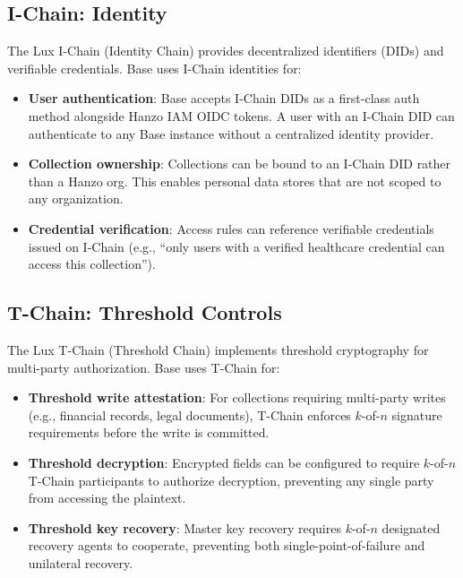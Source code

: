 \documentclass[11pt]{article}
\begin{document}
\subsection{I-Chain: Identity}

The Lux I-Chain (Identity Chain) provides decentralized identifiers (DIDs)
and verifiable credentials. Base uses I-Chain identities for:

\begin{itemize}[leftmargin=1.1em]
    \item \textbf{User authentication}: Base accepts I-Chain DIDs as a first-class
    auth method alongside Hanzo IAM OIDC tokens. A user with an I-Chain DID
    can authenticate to any Base instance without a centralized identity
    provider.
    \item \textbf{Collection ownership}: Collections can be bound to an I-Chain
    DID rather than a Hanzo org. This enables personal data stores that are
    not scoped to any organization.
    \item \textbf{Credential verification}: Access rules can reference verifiable
    credentials issued on I-Chain (e.g., ``only users with a verified
    healthcare credential can access this collection'').
\end{itemize}

\subsection{T-Chain: Threshold Controls}

The Lux T-Chain (Threshold Chain) implements threshold cryptography for
multi-party authorization. Base uses T-Chain for:

\begin{itemize}[leftmargin=1.1em]
    \item \textbf{Threshold write attestation}: For collections requiring
    multi-party writes (e.g., financial records, legal documents), T-Chain
    enforces $k$-of-$n$ signature requirements before the write is committed.
    \item \textbf{Threshold decryption}: Encrypted fields can be configured to
    require $k$-of-$n$ T-Chain participants to authorize decryption, preventing
    any single party from accessing the plaintext.
    \item \textbf{Threshold key recovery}: Master key recovery requires
    $k$-of-$n$ designated recovery agents to cooperate, preventing both
    single-point-of-failure and unilateral recovery.
\end{itemize}
\end{document}
